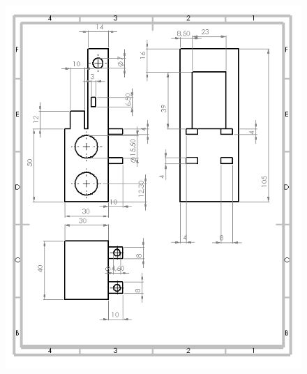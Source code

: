 \begin{changemargin}{-2cm}{-4cm}
\begin{figure}[!h]
\label{chariot}
 \center
 \includegraphics[scale=1]{../3Dmodels/chariot.png}
\end{figure}


\end{changemargin}
